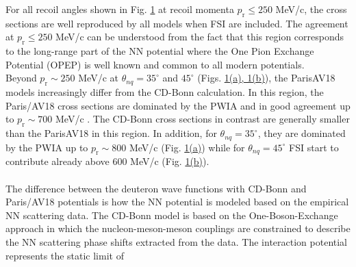 \indent For all recoil angles shown in Fig. \hyperref[fig:fig1]{1} at recoil momenta $p_{\mathrm{r}}\leq250$ MeV/c, the cross sections are well reproduced by all models when FSI are included.
The agreement at $p_{\mathrm{r}}\leq250$ MeV/c can be understood from the fact that this region corresponds to the long-range part of the NN potential where the One Pion Exchange Potential (OPEP)
is well known and common to all modern potentials. \\
\indent Beyond $p_{\mathrm{r}}\sim250$ MeV/c at $\theta_{nq}=35^{\circ}$ and $45^{\circ}$ (Figs. \hyperref[fig:fig1]{1(a), 1(b)}), the Paris\DIFdelbegin {}\DIFdelend \DIFaddbegin \DIFadd{,
}\DIFaddend AV18 \DIFaddbegin {}\DIFaddend models increasingly differ from the CD-Bonn calculation. In this region, the Paris/AV18 cross sections are dominated by the PWIA and in good agreement up to $p_{\mathrm{r}}\sim700$ MeV/c \DIFaddbegin {}\DIFaddend . The CD-Bonn cross sections in contrast are generally smaller than the Paris\DIFdelbegin \DIFdel{/}\DIFdelend \DIFaddbegin \DIFadd{, }\DIFaddend AV18 \DIFaddbegin {}\DIFaddend in this region.
In addition, for $\theta_{nq}=35^{\circ}$, they are dominated by the PWIA up to $p_{\mathrm{r}}\sim800$ MeV/c
(Fig. \hyperref[fig:fig1]{1(a)})  while for $\theta_{nq}=45^{\circ}$  FSI start to contribute already above 600 MeV/c (Fig. \hyperref[fig:fig1]{1(b)}).\\
\indent \DIFaddbegin {}\\ 
\indent \DIFaddend The difference between the deuteron wave functions with CD-Bonn and Paris/AV18 potentials is 
how the NN potential is modeled based on the empirical NN scattering data.
The CD-Bonn model is based on the One-Boson-Exchange approach in which the 
nucleon-meson-meson couplings are constrained to describe the NN scattering phase shifts
extracted from the data. The interaction potential represents the static limit of 
